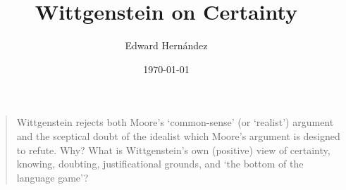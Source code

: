 \documentclass[man,12pt,natbib]{apa6}
\begin{document}
\title{Wittgenstein on Certainty}
\author{Edward Hern\'{a}ndez}
\date{\today}

\maketitle

\begin{quote}
	Wittgenstein rejects both Moore's `common-sense' (or `realist') argument
	and the sceptical doubt of the idealist which Moore's argument is designed
	to refute.  Why?  What is Wittgenstein's own (positive) view of certainty,
	knowing, doubting, justificational grounds, and `the bottom of the language
	game'?









\end{quote}
\end{document}
